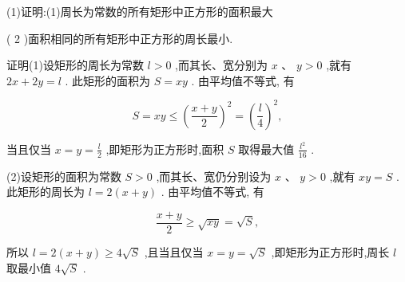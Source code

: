 \documentclass[11pt,a4paper]{article}
\begin{document}
\begin{problem} 
(1)证明:(1)周长为常数的所有矩形中正方形的面积最大

( 2 )面积相同的所有矩形中正方形的周长最小.
\begin{jiexi}[55]
证明(1)设矩形的周长为常数 \(\displaystyle l > 0\) ,而其长、宽分别为 \(\displaystyle x\text{ 、 }y > 0\) ,就有 \(\displaystyle {2x} + {2y} = l\) . 此矩形的面积为 \(\displaystyle S = {xy}\) . 由平均值不等式, 有

\[
S = {xy} \leq  {\left( \frac{x + y}{2}\right) }^{2} = {\left( \frac{l}{4}\right) }^{2},
\]

当且仅当 \(\displaystyle x = y = \frac{l}{2}\) ,即矩形为正方形时,面积 \(\displaystyle S\) 取得最大值 \(\displaystyle \frac{{l}^{2}}{16}\) .

(2)设矩形的面积为常数 \(\displaystyle S > 0\) ,而其长、宽仍分别设为 \(\displaystyle x\text{ 、 }y > 0\) ,就有 \(\displaystyle {xy} = S\) . 此矩形的周长为 \(\displaystyle l = 2\left( {x + y}\right)\) . 由平均值不等式, 有

\[
\frac{x + y}{2} \geq  \sqrt{xy} = \sqrt{S},
\]

所以 \(\displaystyle l = 2\left( {x + y}\right)  \geq  4\sqrt{S}\) ,且当且仅当 \(\displaystyle x = y = \sqrt{S}\) ,即矩形为正方形时,周长 \(\displaystyle l\) 取最小值 \(\displaystyle 4\sqrt{S}\) .


\end{jiexi}
\end{problem}
\sclear
\end{document}
